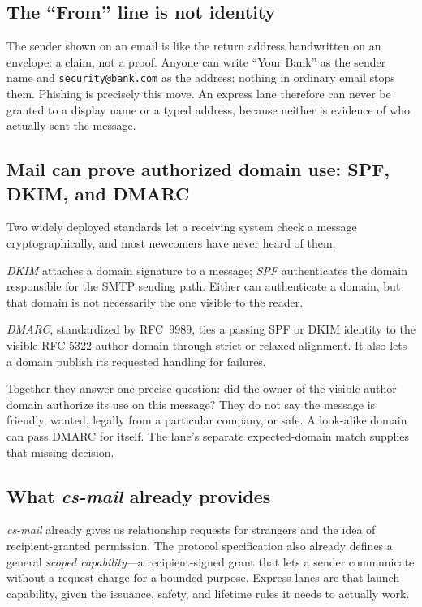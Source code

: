 \documentclass[11pt]{article}
\begin{document}
\subsection{The ``From'' line is not identity}

The sender shown on an email is like the return address handwritten on an
envelope: a claim, not a proof. Anyone can write ``Your Bank'' as the sender name
and \texttt{security@bank.com} as the address; nothing in ordinary email stops
them. Phishing is precisely this move. An express lane therefore can never be
granted to a display name or a typed address, because neither is evidence of who
actually sent the message.

\subsection{Mail can prove authorized domain use: SPF, DKIM, and DMARC}

Two widely deployed standards let a receiving system check a message
cryptographically, and most newcomers have never heard of them.

\emph{DKIM} attaches a domain signature to a message; \emph{SPF} authenticates the
domain responsible for the SMTP sending path. Either can authenticate a domain,
but that domain is not necessarily the one visible to the reader.

\emph{DMARC}, standardized by RFC~9989, ties a passing SPF or DKIM identity to the
visible RFC 5322 author domain through strict or relaxed alignment. It also
lets a domain publish its requested handling for failures.

Together they answer one precise question: did the owner of the visible author
domain authorize its use on this message? They do not say the message is friendly,
wanted, legally from a particular company, or safe. A look-alike domain can pass
DMARC for itself. The lane's separate expected-domain match supplies that missing
decision.

\subsection{What \textit{cs-mail} already provides}

\textit{cs-mail} already gives us relationship requests for strangers and the idea
of recipient-granted permission. The protocol specification also already defines a
general \emph{scoped capability}---a recipient-signed grant that lets a sender
communicate without a request charge for a bounded purpose. Express lanes are that launch capability, given the
issuance, safety, and lifetime rules it needs to actually work.
\end{document}

